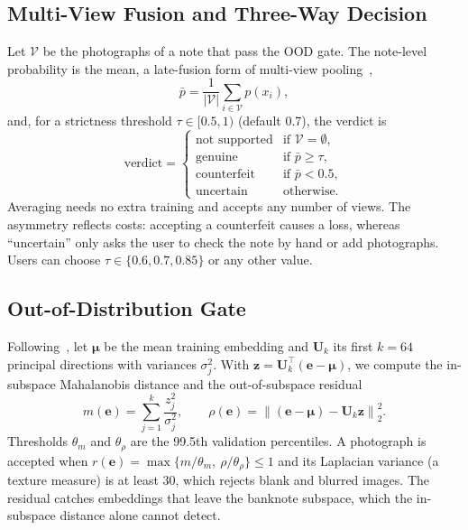 \documentclass[journal,onecolumn]{IEEEtran}
\begin{document}
\subsection{Multi-View Fusion and Three-Way Decision}
\label{sec:decision}
Let $\mathcal{V}$ be the photographs of a note that pass the OOD gate. The note-level
probability is the mean, a late-fusion form of multi-view pooling~\cite{su2015mvcnn},
\begin{equation}
\bar{p} = \frac{1}{|\mathcal{V}|}\sum_{i\in\mathcal{V}} p(x_i),
\label{eq:fusion}
\end{equation}
and, for a strictness threshold $\tau\in[0.5,1)$ (default 0.7), the verdict is
\begin{equation}
\text{verdict} =
\begin{cases}
\text{not supported} & \text{if } \mathcal{V}=\emptyset,\\
\text{genuine} & \text{if } \bar{p}\ge\tau,\\
\text{counterfeit} & \text{if } \bar{p}<0.5,\\
\text{uncertain} & \text{otherwise.}
\end{cases}
\label{eq:decision}
\end{equation}
Averaging needs no extra training and accepts any number of views. The asymmetry
reflects costs: accepting a counterfeit causes a loss, whereas ``uncertain'' only asks
the user to check the note by hand or add photographs. Users can choose
$\tau\in\{0.6,0.7,0.85\}$ or any other value.

\subsection{Out-of-Distribution Gate}
\label{sec:ood}
Following~\cite{lee2018mahalanobis}, let $\boldsymbol{\mu}$ be the mean training
embedding and $\mathbf{U}_k$ its first $k=64$ principal directions with variances
$\sigma_j^2$. With $\mathbf{z}=\mathbf{U}_k^{\top}(\mathbf{e}-\boldsymbol{\mu})$, we
compute the in-subspace Mahalanobis distance and the out-of-subspace residual
\begin{equation}
m(\mathbf{e}) = \sum_{j=1}^{k}\frac{z_j^2}{\sigma_j^2},\qquad
\rho(\mathbf{e}) = \left\lVert(\mathbf{e}-\boldsymbol{\mu})-\mathbf{U}_k\mathbf{z}\right\rVert_2^2 .
\label{eq:ood}
\end{equation}
Thresholds $\theta_m$ and $\theta_\rho$ are the 99.5th validation percentiles. A
photograph is accepted when
$r(\mathbf{e})=\max\{m/\theta_m,\ \rho/\theta_\rho\}\le1$ and its Laplacian variance (a
texture measure) is at least 30, which rejects blank and blurred images. The residual
catches embeddings that leave the banknote subspace, which the in-subspace distance
alone cannot detect.
\end{document}
